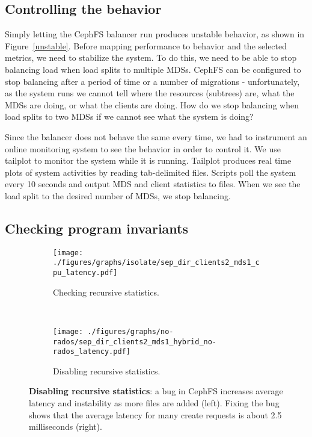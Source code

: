 \subsection{Controlling the behavior}

Simply letting the CephFS balancer run produces unstable behavior, as shown in Figure~\ref{unstable}. Before mapping performance to behavior and the selected metrics, we need to stabilize the system. To do this, we need to be able to stop balancing load when load splits to multiple MDSs. CephFS can be configured to stop balancing after a period of time  or a number of migrations - unfortunately, as the system runs we cannot tell where the resources (subtrees) are, what the MDSs are doing, or what the clients are doing. How do we stop balancing when load splits to two MDSs if we cannot see what the system is doing? 

Since the balancer does not behave the same every time, we had to instrument an online monitoring system to see the behavior in order to control it. We use tailplot to monitor the system while it is running. Tailplot produces real time plots of system activities by reading tab-delimited files. Scripts poll the system every 10 seconds and output MDS and client statistics to files. When we see the load split to the desired number of MDSs, we stop balancing. 


\subsection{Checking program invariants}
\begin{figure*}[tbh]
	\begin{subfigure}[H]{0.5\textwidth}
	\centering
	\texttt{[image: ./figures/graphs/isolate/sep\_dir\_clients2\_mds1\_cpu\_latency.pdf]}
	\caption{Checking recursive statistics.\label{recursive}}
	\end{subfigure}
	~
	\begin{subfigure}[H]{0.5\textwidth}
	\centering	
	\texttt{[image: ./figures/graphs/no-rados/sep\_dir\_clients2\_mds1\_hybrid\_no-rados\_latency.pdf]} 
	\caption{Disabling recursive statistics.\label{nonrecursive}}
	\end{subfigure}	
	\caption{\textbf{Disabling recursive statistics}: a bug in CephFS increases average latency and instability as more files are added (left). Fixing the bug shows that the average latency for many create requests is about 2.5 milliseconds (right). \label{recursive-nonrecursive}}
\end{figure*}

